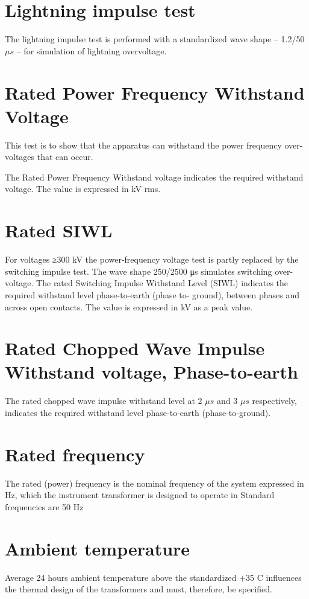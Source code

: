 \section*{Lightning impulse test}
The lightning impulse test is performed with a standardized wave shape – 1.2/50 $\mu s$ – for simulation of lightning overvoltage.
\section*{Rated Power Frequency Withstand Voltage}
This test is to show that the apparatus can withstand the power frequency over-voltages that can occur.

The Rated Power Frequency Withstand voltage indicates the required withstand voltage. The value is expressed in kV rms.

\section*{Rated SIWL}
For voltages ≥300 kV the power-frequency voltage test is partly replaced by the switching impulse test. The wave shape 250/2500 μs simulates switching over-voltage. The rated Switching Impulse Withstand Level (SIWL) indicates the required withstand level phase-to-earth (phase to- ground), between phases and across open contacts. The value is expressed in kV as a peak value.
\section*{Rated Chopped Wave Impulse Withstand voltage, Phase-to-earth}
The rated chopped wave impulse withstand level at 2 $\mu s$ and 3 $\mu s$ respectively, indicates the required withstand level phase-to-earth (phase-to-ground).

\section*{Rated frequency}
The rated (power) frequency is the nominal frequency of the system expressed in Hz, which the instrument transformer is designed to operate in Standard frequencies are 50 Hz 

\section*{Ambient temperature}
Average 24 hours ambient temperature above the standardized +35 \textdegree C influences the thermal design of the transformers and must, therefore, be specified.

